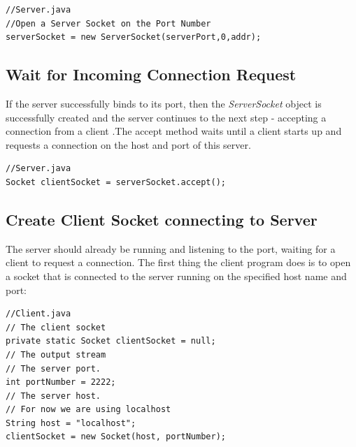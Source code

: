 \documentclass[a4paper,11pt]{article}
\begin{document}
\begin{mdframed}[backgroundcolor=light-gray, roundcorner=30pt,leftmargin=1, rightmargin=1, innerleftmargin=5, innertopmargin=-3,innerbottommargin=5, outerlinewidth=1, linecolor=light-gray]
\begin{lstlisting}
//Server.java
//Open a Server Socket on the Port Number
serverSocket = new ServerSocket(serverPort,0,addr);
\end{lstlisting}
\end{mdframed}

\subsection{Wait for Incoming Connection Request}
If the server successfully binds to its port, then the \textit{ServerSocket} object is successfully created and the server continues to the next step - accepting a connection from a client .The accept method waits until a client starts up and requests a connection on the host and port of this server. 
\begin{mdframed}[backgroundcolor=light-gray, roundcorner=30pt,leftmargin=1, rightmargin=1, innerleftmargin=5, innertopmargin=-3,innerbottommargin=5, outerlinewidth=1, linecolor=light-gray]
\begin{lstlisting}
//Server.java
Socket clientSocket = serverSocket.accept();
\end{lstlisting}
\end{mdframed}

\subsection{Create Client Socket connecting to Server}
The server should already be running and listening to the port, waiting for a client to request a connection. The first thing the client program does is to open a socket that is connected to the server running on the specified host name and port:
\begin{mdframed}[backgroundcolor=light-gray, roundcorner=30pt,leftmargin=1, rightmargin=1, innerleftmargin=5, innertopmargin=-3,innerbottommargin=5, outerlinewidth=1, linecolor=light-gray]
\begin{lstlisting}
//Client.java
// The client socket
private static Socket clientSocket = null;
// The output stream
// The server port.
int portNumber = 2222;
// The server host.
// For now we are using localhost
String host = "localhost";
clientSocket = new Socket(host, portNumber);
\end{lstlisting}
\end{mdframed}
\end{document}
